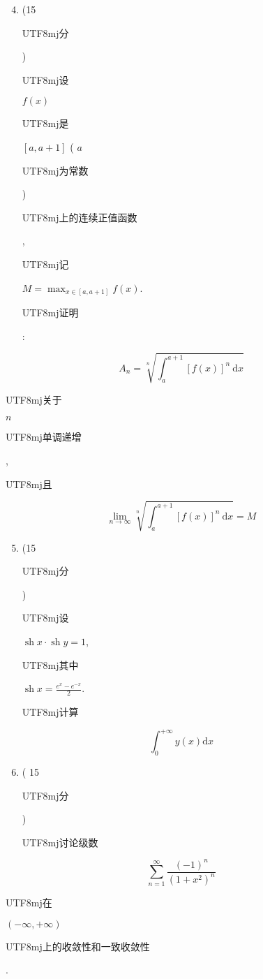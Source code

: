 \documentclass[10pt]{article}
\begin{document}
\begin{enumerate}
  \setcounter{enumi}{3}
  \item (15 \begin{CJK}{UTF8}{mj}分\end{CJK}) \begin{CJK}{UTF8}{mj}设\end{CJK} $f(x)$ \begin{CJK}{UTF8}{mj}是\end{CJK} $[a, a+1]$ ( $a$ \begin{CJK}{UTF8}{mj}为常数\end{CJK}) \begin{CJK}{UTF8}{mj}上的连续正值函数\end{CJK}, \begin{CJK}{UTF8}{mj}记\end{CJK} $M=\max _{x \in[a, a+1]} f(x)$. \begin{CJK}{UTF8}{mj}证明\end{CJK}:
\end{enumerate}
$$
A_{n}=\sqrt[n]{\int_{a}^{a+1}[f(x)]^{n} \mathrm{~d} x}
$$
\begin{CJK}{UTF8}{mj}关于\end{CJK} $n$ \begin{CJK}{UTF8}{mj}单调递增\end{CJK}, \begin{CJK}{UTF8}{mj}且\end{CJK}
$$
\lim _{n \rightarrow \infty} \sqrt[n]{\int_{a}^{a+1}[f(x)]^{n} \mathrm{~d} x}=M
$$

\begin{enumerate}
  \setcounter{enumi}{4}
  \item (15 \begin{CJK}{UTF8}{mj}分\end{CJK}) \begin{CJK}{UTF8}{mj}设\end{CJK} $\operatorname{sh} x \cdot \operatorname{sh} y=1$, \begin{CJK}{UTF8}{mj}其中\end{CJK} $\operatorname{sh} x=\frac{e^{x}-e^{-x}}{2}$. \begin{CJK}{UTF8}{mj}计算\end{CJK}
\end{enumerate}
$$
\int_{0}^{+\infty} y(x) \mathrm{d} x
$$

\begin{enumerate}
  \setcounter{enumi}{5}
  \item ( 15 \begin{CJK}{UTF8}{mj}分\end{CJK}) \begin{CJK}{UTF8}{mj}讨论级数\end{CJK}
\end{enumerate}
$$
\sum_{n=1}^{\infty} \frac{(-1)^{n}}{\left(1+x^{2}\right)^{n}}
$$
\begin{CJK}{UTF8}{mj}在\end{CJK} $(-\infty,+\infty)$ \begin{CJK}{UTF8}{mj}上的收敛性和一致收敛性\end{CJK}.
\end{document}
